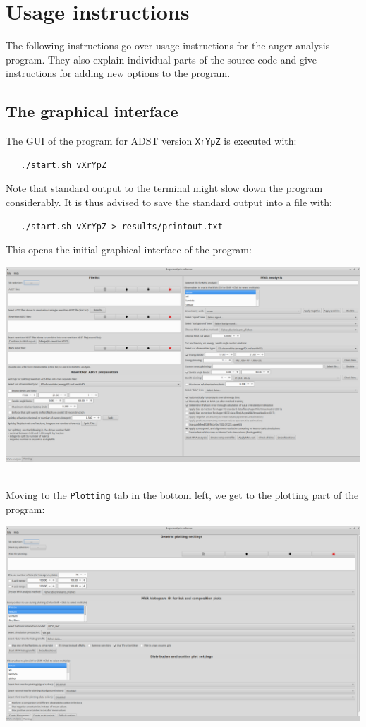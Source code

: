 \documentclass[12pt,a4paper]{report}
\begin{document}

\chapter{Usage instructions}
The following instructions go over usage instructions for the auger-analysis program. They also explain individual parts of the source code and give instructions for adding new options to the program.

\section{The graphical interface}
The GUI of the program for ADST version \texttt{XrYpZ} is executed with:
\begin{verbatim}
   ./start.sh vXrYpZ
\end{verbatim}
Note that standard output to the terminal might slow down the program considerably. It is thus advised to save the standard output into a file with:
\begin{verbatim}
   ./start.sh vXrYpZ > results/printout.txt
\end{verbatim}
This opens the initial graphical interface of the program:\\
\centerline{\includegraphics[width=0.999\textwidth]{figures/software_screenshot_1.png}}\\

Moving to the \texttt{Plotting} tab in the bottom left, we get to the plotting part of the program:\\
\centerline{\includegraphics[width=0.999\textwidth]{figures/software_screenshot_2.png}}\\
\end{document}
